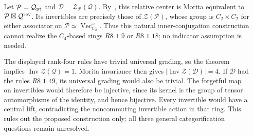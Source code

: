 \begin{remark}
Let $\mathcal P=\mathcal Q_{\rm pt}$ and
$\mathcal D=\mathcal Z_{\mathcal P}(\mathcal Q)$.
By~\cite[Remark~2.4(i)]{GNN}, this relative center is Morita equivalent
to $\mathcal P\boxtimes\mathcal Q^{\rm rev}$.
Its invertibles are precisely those of $\mathcal Z(\mathcal P)$,
whose group is $C_2\times C_2$ for either associator on
$\mathcal P\simeq\operatorname{Vec}_{C_2}^{\omega}$.
Thus this natural inner-conjugation construction cannot realize the
$C_4$-based rings $R8\_1\_9$ or $R8\_1\_18$; no indicator assumption
is needed.

The displayed rank-four rules have trivial universal grading, so the
theorem implies $\operatorname{Inv}\mathcal Z(\mathcal Q)=1$.
Morita invariance then gives
$|\operatorname{Inv}\mathcal Z(\mathcal D)|=4$.
If $\mathcal D$ had the rules $R8\_1\_49$, its universal grading
would also be trivial. The forgetful map on invertibles would therefore
be injective, since its kernel is the group of tensor automorphisms of
the identity, and hence bijective. Every invertible would have a central
lift, contradicting the noncommuting invertible action in that ring.
This rules out the proposed construction only; all three general
categorification questions remain unresolved.
\end{remark}
